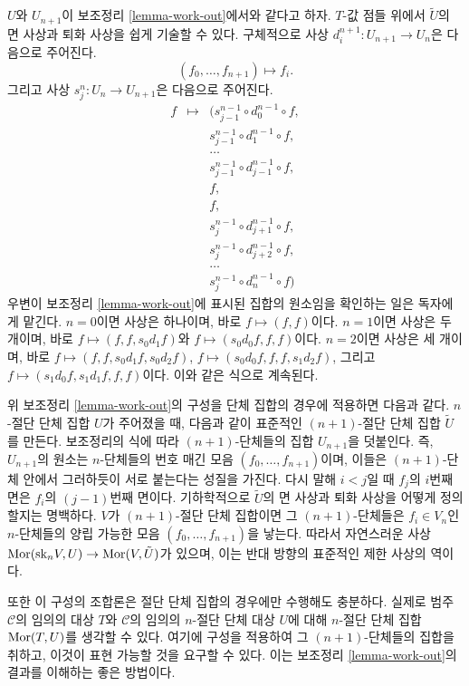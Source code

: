 \begin{remark}
\label{remark-explicit-face-degeneracy}
$U$와 $U_{n + 1}$이 보조정리 \ref{lemma-work-out}에서와 같다고 하자.
$T$-값 점들 위에서 $\tilde U$의 면 사상과 퇴화 사상을 쉽게 기술할 수 있다.
구체적으로 사상 $d^{n + 1}_i : U_{n + 1} \to U_n$은 다음으로 주어진다.
$$
(f_0, \ldots, f_{n + 1}) \longmapsto f_i.
$$
그리고 사상 $s^n_j : U_n \to U_{n + 1}$은 다음으로 주어진다.
\begin{eqnarray*}
f & \longmapsto & (
s^{n - 1}_{j - 1} \circ d^{n - 1}_0 \circ f, \\
& &
s^{n - 1}_{j - 1} \circ d^{n - 1}_1 \circ f, \\
& &
\ldots\\
& &
s^{n - 1}_{j - 1} \circ d^{n - 1}_{j - 1} \circ f, \\
& &
f, \\
& &
f, \\
& &
s^{n - 1}_j \circ d^{n - 1}_{j + 1} \circ f, \\
& &
s^{n - 1}_j \circ d^{n - 1}_{j + 2} \circ f, \\
& &
\ldots\\
& &
s^{n - 1}_j \circ d^{n - 1}_n \circ f
)
\end{eqnarray*}
우변이 보조정리 \ref{lemma-work-out}에 표시된 집합의 원소임을 확인하는
일은 독자에게 맡긴다. $n = 0$이면 사상은 하나이며, 바로
$f \mapsto (f, f)$이다. $n = 1$이면 사상은 두 개이며, 바로
$f \mapsto (f, f, s_0d_1f)$와
$f \mapsto (s_0d_0f, f, f)$이다.
$n = 2$이면 사상은 세 개이며, 바로
$f \mapsto (f, f, s_0d_1f, s_0d_2f)$,
$f \mapsto (s_0d_0f, f, f, s_1d_2f)$, 그리고
$f \mapsto (s_1d_0f, s_1d_1f, f, f)$이다.
이와 같은 식으로 계속된다.
\end{remark}

\begin{remark}
\label{remark-cosk-simplicial-sets}
위 보조정리 \ref{lemma-work-out}의 구성을 단체 집합의 경우에 적용하면
다음과 같다. $n$-절단 단체 집합 $U$가 주어졌을 때, 다음과 같이 표준적인
$(n + 1)$-절단 단체 집합 $\tilde U$를 만든다. 보조정리의 식에 따라
$(n + 1)$-단체들의 집합 $U_{n + 1}$을 덧붙인다. 즉,
$U_{n + 1}$의 원소는 $n$-단체들의 번호 매긴 모음
$(f_0, \ldots, f_{n + 1})$이며, 이들은 $(n + 1)$-단체 안에서 그러하듯이
서로 붙는다는 성질을 가진다. 다시 말해 $i < j$일 때 $f_j$의 $i$번째 면은
$f_i$의 $(j-1)$번째 면이다. 기하학적으로 $\tilde U$의 면 사상과
퇴화 사상을 어떻게 정의할지는 명백하다.
$V$가 $(n + 1)$-절단 단체 집합이면 그 $(n + 1)$-단체들은
$f_i \in V_n$인 $n$-단체들의 양립 가능한 모음
$(f_0, \ldots, f_{n + 1})$을 낳는다. 따라서 자연스러운 사상
$\mathop{\mathrm{Mor}}\nolimits(\text{sk}_nV, U) \to \mathop{\mathrm{Mor}}\nolimits(V, \tilde U)$가 있으며, 이는 반대 방향의
표준적인 제한 사상의 역이다.

\medskip\noindent
또한 이 구성의 조합론은 절단 단체 집합의 경우에만 수행해도 충분하다.
실제로 범주 $\mathcal{C}$의 임의의 대상 $T$와 $\mathcal{C}$의 임의의
$n$-절단 단체 대상 $U$에 대해 $n$-절단 단체 집합 $\mathop{\mathrm{Mor}}\nolimits(T, U)$를
생각할 수 있다. 여기에 구성을 적용하여 그 $(n + 1)$-단체들의 집합을
취하고, 이것이 표현 가능할 것을 요구할 수 있다. 이는 보조정리
\ref{lemma-work-out}의 결과를 이해하는 좋은 방법이다.
\end{remark}

